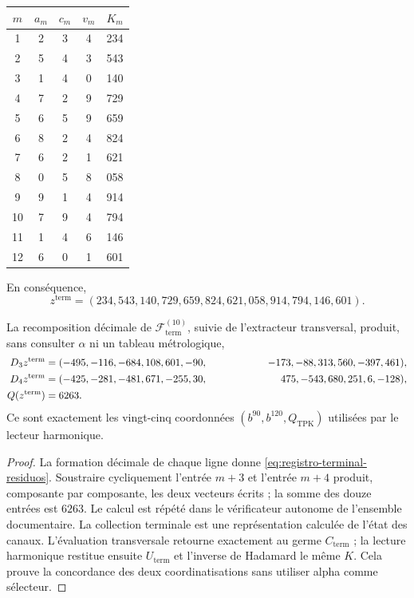 \begin{center}
\begin{tabular}{c@{\qquad}ccc@{\qquad}c}
\toprule
\(m\)&\(a_m\)&\(c_m\)&\(v_m\)&\(K_m\)\\
\midrule
1&2&3&4&234\\
2&5&4&3&543\\
3&1&4&0&140\\
4&7&2&9&729\\
5&6&5&9&659\\
6&8&2&4&824\\
7&6&2&1&621\\
8&0&5&8&058\\
9&9&1&4&914\\
10&7&9&4&794\\
11&1&4&6&146\\
12&6&0&1&601\\
\bottomrule
\end{tabular}
\end{center}
En conséquence,
\begin{equation}
 z^{\mathrm{term}}
 =(234,543,140,729,659,824,621,058,914,794,146,601).
 \label{eq:registro-terminal-residuos}
\end{equation}

\begin{proposition}
\label{prop:registro-terminal-coordenadas}
La recomposition décimale de \(\mathscr F_{\mathrm{term}}^{(10)}\), suivie
de l’extracteur transversal, produit, sans consulter \(\alpha\) ni un tableau
métrologique,
\begin{align*}
 D_3z^{\mathrm{term}}={}&(-495,-116,-684,108,601,-90,
 &\hspace{18mm}-173,-88,313,560,-397,461),\\
 D_4z^{\mathrm{term}}={}&(-425,-281,-481,671,-255,30,
 &\hspace{18mm}475,-543,680,251,6,-128),\\
 Q(z^{\mathrm{term}})={}&6263.
\end{align*}
Ce sont exactement les vingt-cinq coordonnées
\((b^{90},b^{120},Q_{\mathrm{TPK}})\) utilisées par le lecteur harmonique.
\end{proposition}

\begin{proof}
La formation décimale de chaque ligne donne \eqref{eq:registro-terminal-residuos}. Soustraire cycliquement l'entrée \(m+3\) et l'entrée \(m+4\) produit, composante par composante, les deux vecteurs écrits ; la somme des douze entrées est \(6263\). Le calcul est répété dans le vérificateur autonome de l'ensemble documentaire. La collection terminale est une représentation calculée de l'état des canaux. L'évaluation transversale retourne exactement au germe \(C_{\mathrm{term}}\) ; la lecture harmonique restitue ensuite \(U_{\mathrm{term}}\) et l'inverse de Hadamard le même \(K\). Cela prouve la concordance des deux coordinatisations sans utiliser alpha comme sélecteur.
\end{proof}

